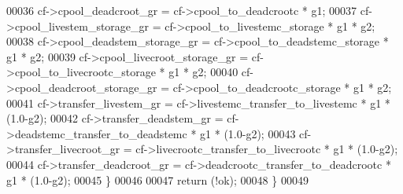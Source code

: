\begin{DoxyCode}
00036         cf->cpool\_deadcroot\_gr    = cf->cpool\_to\_deadcrootc * g1;
00037         cf->cpool\_livestem\_storage\_gr  = cf->cpool\_to\_livestemc\_storage * g1 * g2;
00038         cf->cpool\_deadstem\_storage\_gr  = cf->cpool\_to\_deadstemc\_storage * g1 * g2;
00039         cf->cpool\_livecroot\_storage\_gr = cf->cpool\_to\_livecrootc\_storage * g1 * g2;
00040         cf->cpool\_deadcroot\_storage\_gr = cf->cpool\_to\_deadcrootc\_storage * g1 * g2;
00041         cf->transfer\_livestem\_gr  = cf->livestemc\_transfer\_to\_livestemc * g1 * (1.0-g2);
00042         cf->transfer\_deadstem\_gr  = cf->deadstemc\_transfer\_to\_deadstemc * g1 * (1.0-g2);
00043         cf->transfer\_livecroot\_gr = cf->livecrootc\_transfer\_to\_livecrootc * g1 * (1.0-g2);
00044         cf->transfer\_deadcroot\_gr = cf->deadcrootc\_transfer\_to\_deadcrootc * g1 * (1.0-g2);
00045     \}
00046     
00047     \textcolor{keywordflow}{return} (!ok);
00048 \}
00049 
\end{DoxyCode}
